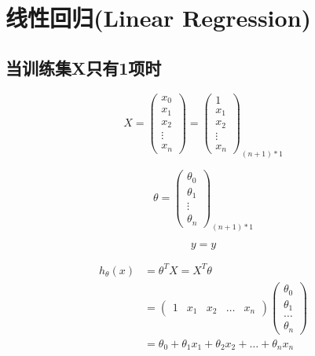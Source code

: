 \section{线性回归(Linear Regression)}
\subsection{当训练集X只有1项时}
   
\begin{equation}
	X = \left(\begin{matrix}
			x_0 \\ x_1 \\ x_2 \\ \vdots \\ x_n
		\end{matrix}\right)
	= \left(\begin{matrix}
			1 \\ x_1 \\ x_2 \\ \vdots \\ x_n
		\end{matrix}\right)_{(n+1)*1}
\end{equation}


\begin{equation}
	\theta = \left(\begin{matrix}
			\theta_0 \\ \theta_1 \\ \vdots \\ \theta_n
		\end{matrix}\right)_{(n+1)*1}
\end{equation}


\begin{equation}
y = y
\end{equation}


\begin{equation} \begin{aligned}
	h_\theta(x) & = \theta^{T}X = X^T\theta \\
	& = \left( \begin{matrix}
			1 & x_1 & x_2 & \dots & x_n
		\end{matrix}\right)
		\left(\begin{matrix}
			\theta_0 \\
			\theta_1 \\
			\dots \\
			\theta_n
		\end{matrix}\right) \\
	& = \theta_0 + \theta_1x_1 + \theta_2x_2 + \dots + \theta_nx_n
\end{aligned} \end{equation}



